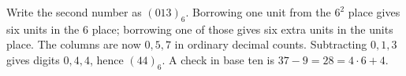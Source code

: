 Write the second number as $(013)_6$. Borrowing one unit from the $6^2$ place gives six units in the $6$ place; borrowing one of those gives six extra units in the units place. The columns are now $0,5,7$ in ordinary decimal counts. Subtracting $0,1,3$ gives digits $0,4,4$, hence $\boxed{(44)_6}$. A check in base ten is $37-9=28=4\cdot6+4$.

